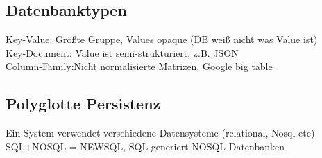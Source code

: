 \documentclass[a4paper]{article}
\begin{document}
\subsection{Datenbanktypen}
Key-Value: Größte Gruppe, Values opaque (DB weiß nicht was Value ist)\\
Key-Document: Value ist semi-strukturiert, z.B. JSON\\
Column-Family:Nicht normalisierte Matrizen, Google big table
\subsection{Polyglotte Persistenz}
Ein System verwendet verschiedene Datensysteme (relational, Nosql etc)\\
SQL+NOSQL = NEWSQL, SQL generiert NOSQL Datenbanken\\
\end{document}
